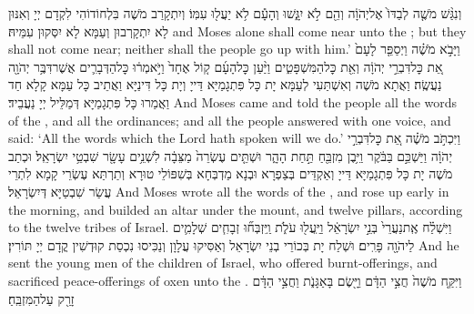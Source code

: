 {וְנִגַּ֨שׁ מֹשֶׁ֤ה לְבַדּוֹ֙ אֶל\maqqaf יְהֹוָ֔ה וְהֵ֖ם לֹ֣א יִגָּ֑שׁוּ וְהָעָ֕ם לֹ֥א יַעֲל֖וּ עִמּֽוֹ׃}
{וְיִתְקָרַב מֹשֶׁה בִּלְחוֹדוֹהִי לִקְדָם יְיָ וְאִנּוּן לָא יִתְקָרְבוּן וְעַמָּא לָא יִסְּקוּן עִמֵּיהּ׃}
{and Moses alone shall come near unto the \lord; but they shall not come near; neither shall the people go up with him.’}{}
{וַיָּבֹ֣א מֹשֶׁ֗ה וַיְסַפֵּ֤ר לָעָם֙ אֵ֚ת כׇּל\maqqaf דִּבְרֵ֣י יְהֹוָ֔ה וְאֵ֖ת כׇּל\maqqaf הַמִּשְׁפָּטִ֑ים וַיַּ֨עַן כׇּל\maqqaf הָעָ֜ם ק֤וֹל אֶחָד֙ וַיֹּ֣אמְר֔וּ כׇּל\maqqaf הַדְּבָרִ֛ים אֲשֶׁר\maqqaf דִּבֶּ֥ר יְהֹוָ֖ה נַעֲשֶֽׂה׃}
{וַאֲתָא מֹשֶׁה וְאִשְׁתַּעִי לְעַמָּא יָת כָּל פִּתְגָמַיָּא דַּייָ וְיָת כָּל דִּינַיָּא וַאֲתֵיב כָּל עַמָּא קָלָא חַד וַאֲמַרוּ כָּל פִּתְגָמַיָּא דְּמַלֵּיל יְיָ נַעֲבֵיד׃}
{And Moses came and told the people all the words of the \lord, and all the ordinances; and all the people answered with one voice, and said: ‘All the words which the Lord hath spoken will we do.’}{}
{וַיִּכְתֹּ֣ב מֹשֶׁ֗ה אֵ֚ת כׇּל\maqqaf דִּבְרֵ֣י יְהֹוָ֔ה וַיַּשְׁכֵּ֣ם בַּבֹּ֔קֶר וַיִּ֥בֶן מִזְבֵּ֖חַ תַּ֣חַת הָהָ֑ר וּשְׁתֵּ֤ים עֶשְׂרֵה֙ מַצֵּבָ֔ה לִשְׁנֵ֥ים עָשָׂ֖ר שִׁבְטֵ֥י יִשְׂרָאֵֽל׃}
{וּכְתַב מֹשֶׁה יָת כָּל פִּתְגָמַיָּא דַּייָ וְאַקְדֵּים בְּצַפְרָא וּבְנָא מַדְבְּחָא בְּשִׁפּוֹלֵי טוּרָא וְתַרְתַּא עֶשְׂרֵי קָמָא לִתְרֵי עֲשַׂר שִׁבְטַיָּא דְּיִשְׂרָאֵל׃}
{And Moses wrote all the words of the \lord, and rose up early in the morning, and builded an altar under the mount, and twelve pillars, according to the twelve tribes of Israel.}{}
{וַיִּשְׁלַ֗ח אֶֽת\maqqaf נַעֲרֵי֙ בְּנֵ֣י יִשְׂרָאֵ֔ל וַיַּֽעֲל֖וּ עֹלֹ֑ת וַֽיִּזְבְּח֞וּ זְבָחִ֧ים שְׁלָמִ֛ים לַיהֹוָ֖ה פָּרִֽים׃}
{וּשְׁלַח יָת בְּכוֹרֵי בְנֵי יִשְׂרָאֵל וְאַסִּיקוּ עֲלָוָן וְנַכִּיסוּ נִכְסַת קוּדְשִׁין קֳדָם יְיָ תּוֹרִין׃}
{And he sent the young men of the children of Israel, who offered burnt-offerings, and sacrificed peace-offerings of oxen unto the \lord.}{}
{וַיִּקַּ֤ח מֹשֶׁה֙ חֲצִ֣י הַדָּ֔ם וַיָּ֖שֶׂם בָּאַגָּנֹ֑ת וַחֲצִ֣י הַדָּ֔ם זָרַ֖ק עַל\maqqaf הַמִּזְבֵּֽחַ׃}
